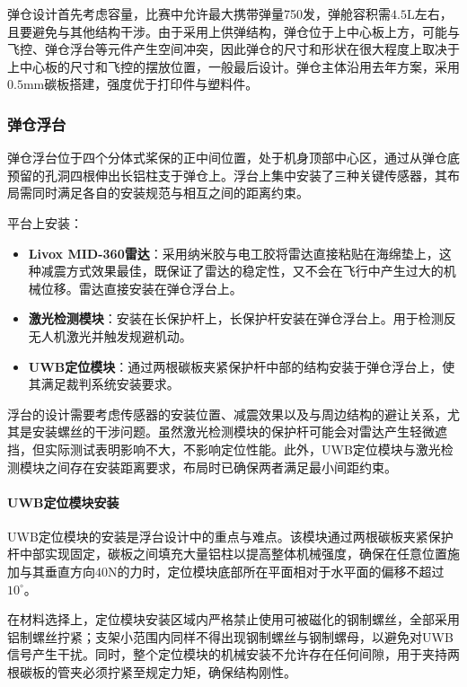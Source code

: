 弹仓设计首先考虑容量，比赛中允许最大携带弹量750发，弹舱容积需$4.5\mathrm{L}$左右，且要避免与其他结构干涉。由于采用上供弹结构，弹仓位于上中心板上方，可能与飞控、弹仓浮台等元件产生空间冲突，因此弹仓的尺寸和形状在很大程度上取决于上中心板的尺寸和飞控的摆放位置，一般最后设计。弹仓主体沿用去年方案，采用$0.5\mathrm{mm}$碳板搭建，强度优于打印件与塑料件。

\subsubsection{弹仓浮台}

弹仓浮台位于四个分体式桨保的正中间位置，处于机身顶部中心区，通过从弹仓底预留的孔洞四根伸出长铝柱支于弹仓上。浮台上集中安装了三种关键传感器，其布局需同时满足各自的安装规范与相互之间的距离约束。

平台上安装：
\begin{itemize}
    \item \textbf{Livox MID-360雷达}：采用纳米胶与电工胶将雷达直接粘贴在海绵垫上，这种减震方式效果最佳，既保证了雷达的稳定性，又不会在飞行中产生过大的机械位移。雷达直接安装在弹仓浮台上。
    \item \textbf{激光检测模块}：安装在长保护杆上，长保护杆安装在弹仓浮台上。用于检测反无人机激光并触发规避机动。
    \item \textbf{UWB定位模块}：通过两根碳板夹紧保护杆中部的结构安装于弹仓浮台上，使其满足裁判系统安装要求。
\end{itemize}

浮台的设计需要考虑传感器的安装位置、减震效果以及与周边结构的避让关系，尤其是安装螺丝的干涉问题。虽然激光检测模块的保护杆可能会对雷达产生轻微遮挡，但实际测试表明影响不大，不影响定位性能。此外，UWB定位模块与激光检测模块之间存在安装距离要求，布局时已确保两者满足最小间距约束。

\paragraph{UWB定位模块安装}

UWB定位模块的安装是浮台设计中的重点与难点。该模块通过两根碳板夹紧保护杆中部实现固定，碳板之间填充大量铝柱以提高整体机械强度，确保在任意位置施加与其垂直方向$40\mathrm{N}$的力时，定位模块底部所在平面相对于水平面的偏移不超过$10^{\circ}$。

在材料选择上，定位模块安装区域内严格禁止使用可被磁化的钢制螺丝，全部采用铝制螺丝拧紧；支架小范围内同样不得出现钢制螺丝与钢制螺母，以避免对UWB信号产生干扰。同时，整个定位模块的机械安装不允许存在任何间隙，用于夹持两根碳板的管夹必须拧紧至规定力矩，确保结构刚性。


